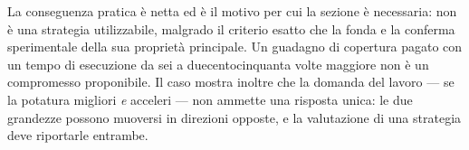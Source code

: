 La conseguenza pratica è netta ed è il motivo per cui la sezione è necessaria: 
non è una strategia utilizzabile, malgrado il criterio esatto che la fonda e la conferma
sperimentale della sua proprietà principale. Un guadagno di copertura pagato con un tempo di
esecuzione da sei a duecentocinquanta volte maggiore non è un compromesso proponibile. Il caso
mostra inoltre che la domanda del lavoro --- se la potatura migliori \emph{e} acceleri --- non
ammette una risposta unica: le due grandezze possono muoversi in direzioni opposte, e la
valutazione di una strategia deve riportarle entrambe.


